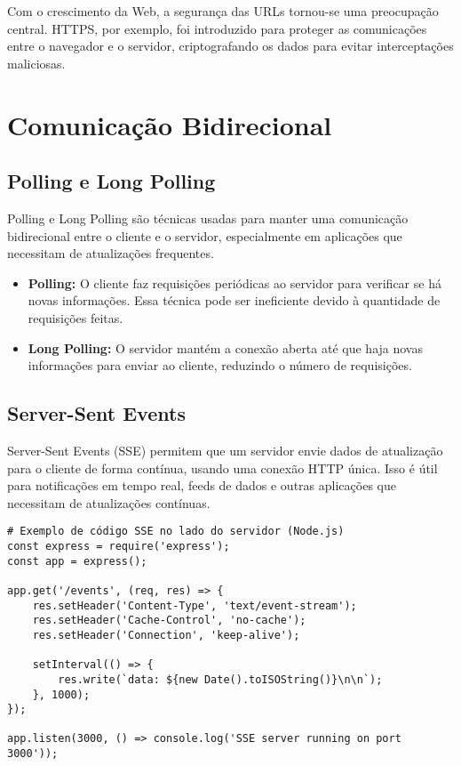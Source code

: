 Com o crescimento da Web, a segurança das URLs tornou-se uma preocupação central. HTTPS, por exemplo, foi introduzido para proteger as comunicações entre o navegador e o servidor, criptografando os dados para evitar interceptações maliciosas.





\section{Comunicação Bidirecional}
\subsection{Polling e Long Polling}
Polling e Long Polling são técnicas usadas para manter uma comunicação bidirecional entre o cliente e o servidor, especialmente em aplicações que necessitam de atualizações frequentes.

\begin{itemize}
    \item \textbf{Polling:} O cliente faz requisições periódicas ao servidor para verificar se há novas informações. Essa técnica pode ser ineficiente devido à quantidade de requisições feitas.
    \item \textbf{Long Polling:} O servidor mantém a conexão aberta até que haja novas informações para enviar ao cliente, reduzindo o número de requisições.
\end{itemize}

\subsection{Server-Sent Events}
Server-Sent Events (SSE) permitem que um servidor envie dados de atualização para o cliente de forma contínua, usando uma conexão HTTP única. Isso é útil para notificações em tempo real, feeds de dados e outras aplicações que necessitam de atualizações contínuas.

\begin{verbatim}
# Exemplo de código SSE no lado do servidor (Node.js)
const express = require('express');
const app = express();

app.get('/events', (req, res) => {
    res.setHeader('Content-Type', 'text/event-stream');
    res.setHeader('Cache-Control', 'no-cache');
    res.setHeader('Connection', 'keep-alive');

    setInterval(() => {
        res.write(`data: ${new Date().toISOString()}\n\n`);
    }, 1000);
});

app.listen(3000, () => console.log('SSE server running on port 3000'));
\end{verbatim}

